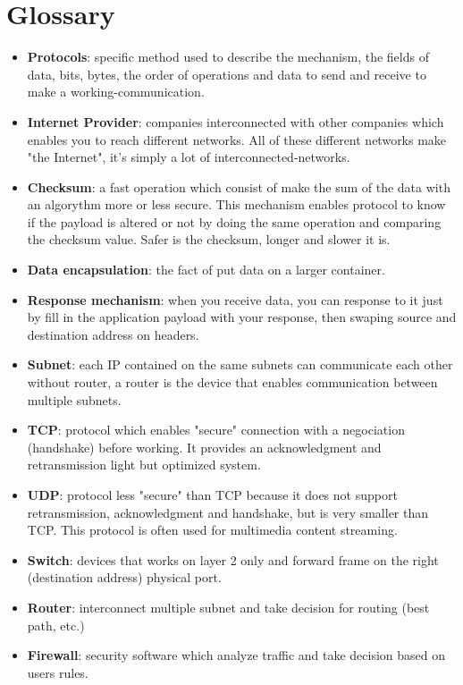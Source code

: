 \documentclass{article}
\begin{document}
	\newpage
	
\section{Glossary}
	
	\begin{itemize}
		\itemsep0em
		\item \textbf{Protocols}:
			specific method used to describe the mechanism, the fields of data, bits, bytes,
			the order of operations and data to send and receive to make a working-communication.
			
		\item \textbf{Internet Provider}: 
			companies interconnected with other companies which enables you to reach different networks.
			All of these different networks make "the Internet", it's simply a lot of interconnected-networks.
			
		\item \textbf{Checksum}: 
			a fast operation which consist of make the sum of the data with an algorythm more or less secure.
			This mechanism enables protocol to know if the payload is altered or not by doing the same operation
			and comparing the checksum value. Safer is the checksum, longer and slower it is.
			
		\item \textbf{Data encapsulation}: 
			the fact of put data on a larger container.
			
		\item \textbf{Response mechanism}: 
			when you receive data, you can response to it just by fill in the application payload
			with your response, then swaping source and destination address on headers.
			
		\item \textbf{Subnet}: 
			each IP contained on the same subnets can communicate each other without router, a router
			is the device that enables communication between multiple subnets.
			
		\item \textbf{TCP}: 
			protocol which enables "secure" connection with a negociation (handshake) before working. It provides
			an acknowledgment and retransmission light but optimized system.
			
		\item \textbf{UDP}: 
			protocol less "secure" than TCP because it does not support retransmission, acknowledgment and handshake,
			but is very smaller than TCP. This protocol is often used for multimedia content streaming.
			
		\item \textbf{Switch}: 
			devices that works on layer 2 only and forward frame on the right (destination address) physical port.
			
		\item \textbf{Router}: 
			interconnect multiple subnet and take decision for routing (best path, etc.)
			
		\item \textbf{Firewall}: 
			security software which analyze traffic and take decision based on users rules.
		
	\end{itemize}
	
\end{document}
